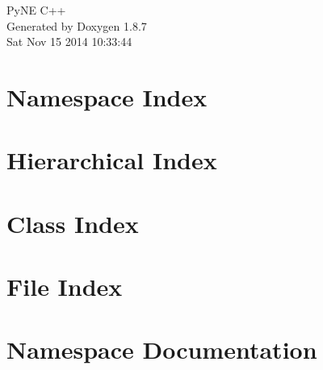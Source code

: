 \documentclass[twoside]{book}
\newcommand{\+}{\discretionary{\mbox{\scriptsize$\hookleftarrow$}}{}{}}
\newcommand{\clearemptydoublepage}{%
  \newpage{\pagestyle{empty}\cleardoublepage}%
}
\begin{document}
\hypersetup{pageanchor=false,
             bookmarks=true,
             bookmarksnumbered=true,
             pdfencoding=unicode
            }
\begin{titlepage}
\vspace*{7cm}
\begin{center}%
{\Large Py\+N\+E C++ }\\
\vspace*{1cm}
{\large Generated by Doxygen 1.8.7}\\
\vspace*{0.5cm}
{\small Sat Nov 15 2014 10:33:44}\\
\end{center}
\end{titlepage}
\clearemptydoublepage
\tableofcontents
\clearemptydoublepage
{}
\hypersetup{pageanchor=true}

\chapter{Namespace Index}

\chapter{Hierarchical Index}

\chapter{Class Index}

\chapter{File Index}

\chapter{Namespace Documentation}















\end{document}
